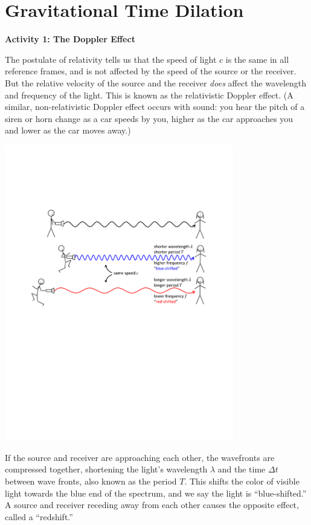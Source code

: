 \section{Gravitational Time Dilation}

\label{gravity_time_lab}
\makelabheader %

\bigskip

\textbf{Activity 1: The Doppler Effect}

The postulate of relativity tells us that the speed of light $c$ is the same in all reference frames, and is not affected by the speed of the source or the receiver.  But the relative velocity of the source and the receiver \textit{does} affect the wavelength and frequency of the light.  This is known as the relativistic Doppler effect.  (A similar, non-relativistic Doppler effect occurs with sound: you hear the pitch of a siren or horn change as a car speeds by you, higher as the car approaches you and lower as the car moves away.)

\begin{center}
\includegraphics[width=0.75\textwidth]{gravity_time/red_shift_blue_shift.pdf}
\end{center}

If the source and receiver are approaching each other, the wavefronts are compressed together, shortening the light's wavelength $\lambda$ and the time $\Delta t$ between wave fronts, also known as the period $T$.  This shifts the color of visible light towards the blue end of the spectrum, and we say the light is ``blue-shifted.''  A source and receiver receding away from each other causes the opposite effect, called a ``redshift.''

